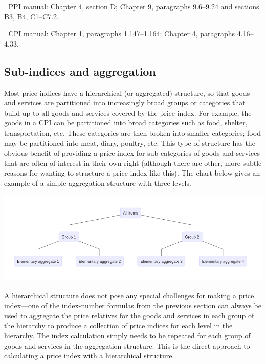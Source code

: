 \documentclass[
]{article}
\begin{document}
📖 PPI manual: Chapter 4, section D; Chapter 9, paragraphs 9.6--9.24 and sections B3, B4, C1--C7.2.

📖 CPI manual: Chapter 1, paragraphs 1.147--1.164; Chapter 4, paragraphs 4.16--4.33.

\hypertarget{sub-indices-and-aggregation}{%
\subsection{Sub-indices and aggregation}\label{sub-indices-and-aggregation}}

Most price indices have a hierarchical (or aggregated) structure, so that goods and services are partitioned into increasingly broad groups or categories that build up to all goods and services covered by the price index. For example, the goods in a CPI can be partitioned into broad categories such as food, shelter, transportation, etc. These categories are then broken into smaller categories; food may be partitioned into meat, diary, poultry, etc. This type of structure has the obvious benefit of providing a price index for sub-categories of goods and services that are often of interest in their own right (although there are other, more subtle reasons for wanting to structure a price index like this). The chart below gives an example of a simple aggregation structure with three levels.

\includegraphics{img/plot1.png}

A hierarchical structure does not pose any special challenges for making a price index---one of the index-number formulas from the previous section can always be used to aggregate the price relatives for the goods and services in each group of the hierarchy to produce a collection of price indices for each level in the hierarchy. The index calculation simply needs to be repeated for each group of goods and services in the aggregation structure. This is the direct approach to calculating a price index with a hierarchical structure.
\end{document}
